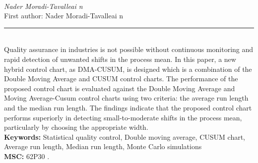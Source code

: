 \documentclass[10pt,twoside]{article}
\begin{document}
\noindent\begin{minipage}[t][\textheight]{\textwidth}
\\[0.35em]
{\itshape Nader Moradi-Tavalleai n}\\[0.2em]
{\footnotesize First author: Nader Moradi-Tavalleai n}\\[0.45em]
\noindent\rule{\textwidth}{0.3pt}\\[0.4em]
{\footnotesize  Quality assurance in industries is not possible without continuous monitoring and rapid detection of unwanted shifts in the process mean. In this paper, a new hybrid control chart, as DMA-CUSUM, is designed which is a combination of the Double Moving Average and CUSUM control charts. The performance of the proposed control chart is evaluated against the Double Moving Average and Moving Average-Cusum control charts using two criteria: the average run length and the median run length. The findings indicate that the proposed control chart performs superiorly in detecting small-to-moderate shifts in the process mean, particularly by choosing the appropriate width.}\\[0.4em]
{\footnotesize\bfseries Keywords:} {\footnotesize Statistical quality control, Double moving average, CUSUM chart, Average run length, Median run length, Monte Carlo simulations}\\[0.15em]
{\footnotesize\bfseries MSC:} {\footnotesize 62P30 .}\\
\vfill
\end{minipage}
\newpage
\end{document}
